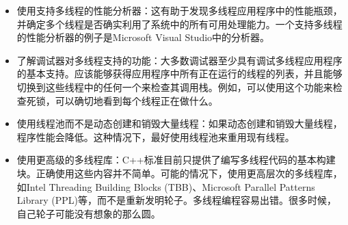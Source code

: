 \begin{itemize}
\item
使用支持多线程的性能分析器：这有助于发现多线程应用程序中的性能瓶颈，并确定多个线程是否确实利用了系统中的所有可用处理能力。一个支持多线程的性能分析器的例子是Microsoft Visual Studio中的分析器。

\item
了解调试器对多线程支持的功能：大多数调试器至少具有调试多线程应用程序的基本支持。应该能够获得应用程序中所有正在运行的线程的列表，并且能够切换到这些线程中的任何一个来检查其调用栈。例如，可以使用这个功能来检查死锁，可以确切地看到每个线程正在做什么。

\item
使用线程池而不是动态创建和销毁大量线程：如果动态创建和销毁大量线程，程序性能会降低。这种情况下，最好使用线程池来重用现有线程。

\item
使用更高级的多线程库：C++标准目前只提供了编写多线程代码的基本构建块。正确使用这些内容并不简单。可能的情况下，使用更高层次的多线程库，如Intel Threading Building Blocks (TBB)、Microsoft Parallel Patterns Library (PPL)等，而不是重新发明轮子。多线程编程容易出错。很多时候，自己轮子可能没有想象的那么圆。
\end{itemize}









































